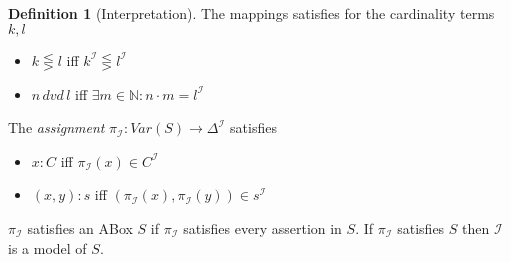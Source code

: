\documentclass[a4paper,11pt]{scrartcl}
\theoremstyle{break}
\theoremstyle{definition}
\newtheorem{mydef}{Definition}
\begin{document}
\begin{mydef}[Interpretation]
The mappings satisfies for the cardinality terms $k,l$
\begin{itemize}
\item $k\lesseqgtr l$ iff $k^\mathcal{I}\lesseqgtr l^\mathcal{I}$
\item $n\,dvd\,l$ iff $\exists m\in\mathbb{N}:n\cdot m = l^\mathcal{I}$
\end{itemize}
The \textit{assignment} $\pi_\mathcal{I}:Var(S)\rightarrow\Delta^\mathcal{I}$ satisfies
\begin{itemize}
\item $x:C$ iff $\pi_\mathcal{I}(x)\in C^\mathcal{I}$ 
\item $(x,y):s$ iff $(\pi_\mathcal{I}(x),\pi_\mathcal{I}(y))\in s^\mathcal{I}$
\end{itemize} 
$\pi_\mathcal{I}$ satisfies an ABox $S$ if $\pi_\mathcal{I}$ satisfies every assertion in $S$. If $\pi_\mathcal{I}$ satisfies $S$ then $\mathcal{I}$ is a model of $S$.
\end{mydef}
\end{document}
